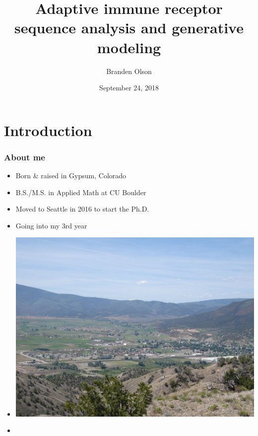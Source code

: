 \documentclass[mathserif,compress]{beamer}
\title[]{Adaptive immune receptor sequence analysis and generative modeling}
\author[]
{Branden Olson}
\date[Sept. 24, 2018]
{September 24, 2018}
\institute[]
{
Department of Statistics
\\
University of Washington Seattle
}
\renewcommand\;{\,}
\begin{document}
\begin{frame}[noframenumbering]
  \titlepage
\end{frame}

\section{Introduction}

\begin{frame}\frametitle{About me}
\begin{center}
\begin{minipage}{0.49\linewidth}
\begin{itemize}
\bigskip
\item Born \& raised in Gypsum, Colorado
\bigskip
\item B.S./M.S. in Applied Math at CU Boulder
\bigskip
\item Moved to Seattle in 2016 to start the Ph.D.
\bigskip
\item Going into my 3rd year
\end{itemize}
\end{minipage}
\begin{minipage}{0.49\linewidth}
\begin{itemize}
\item[]
\includegraphics[width=\linewidth]{Images/Gypsum.jpg}
\bigskip
\item[]
\begin{center}

\end{center}
\end{itemize}
\end{minipage}
\end{center}
\end{frame}
\end{document}
